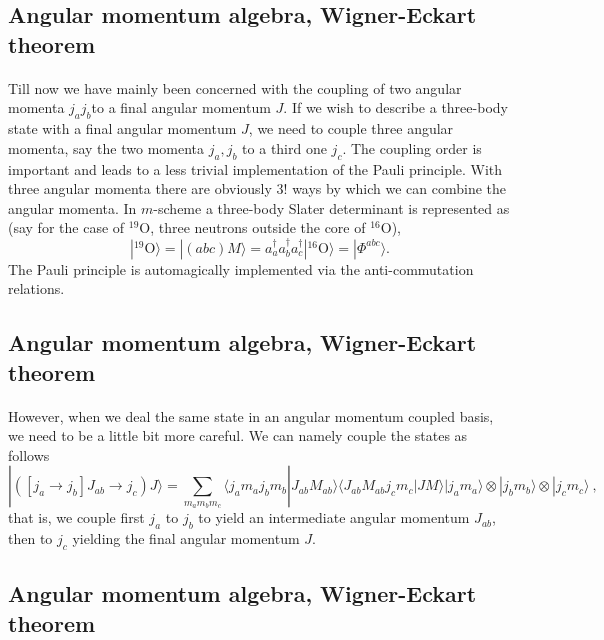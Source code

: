 \documentclass[%
twoside,                 %
final,                   %
10pt]{article}
\begin{document}
\subsection{Angular momentum algebra, Wigner-Eckart theorem}

\paragraph{}
Till now we have mainly been concerned with the coupling of two angular momenta $j_aj_b$to a final angular momentum $J$.
If we wish to describe a three-body state with a final angular momentum $J$, we need to couple three angular momenta, say 
the two momenta $j_a,j_b$ to a third one $j_c$. The coupling order is important and leads to a less trivial implementation of the 
Pauli principle. With three angular momenta there are obviously $3!$ ways by which we can combine the angular momenta. 
In $m$-scheme a three-body Slater determinant is represented as (say for the case of $^{19}$O, three neutrons outside the core of $^{16}$O),
\[
|^{19}\mathrm{O}\rangle =|(abc)M\rangle  = a^{\dagger}_aa^{\dagger}_ba^{\dagger}_c|^{16}\mathrm{O}\rangle=|\Phi^{abc}\rangle.
\]
The Pauli principle is automagically implemented via the anti-commutation relations.


\subsection{Angular momentum algebra, Wigner-Eckart theorem}

\paragraph{}
However, when we deal the same state in an angular momentum coupled basis, we need to be a little bit more careful. We can namely couple the states
as follows
\[
| ([j_a\rightarrow j_b]J_{ab}\rightarrow j_c) J\rangle= \sum_{m_am_bm_c}\langle j_am_aj_bm_b|J_{ab}M_{ab}\rangle \langle J_{ab}M_{ab}j_cm_c|JM\rangle|j_am_a\rangle\otimes |j_bm_b\rangle \otimes |j_cm_c\rangle \ , 
\label{eq:fabc}
\]
that is, we couple first $j_a$ to $j_b$ to yield an intermediate angular momentum $J_{ab}$, then to $j_c$ yielding the final angular momentum $J$.



\subsection{Angular momentum algebra, Wigner-Eckart theorem}
\end{document}
